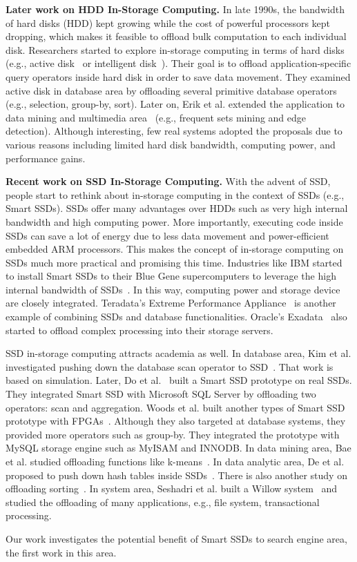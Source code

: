 \textbf{Later work on HDD In-Storage Computing.}
In late 1990s, the bandwidth of hard disks (HDD) kept growing while the cost of powerful processors kept dropping, which makes it feasible to offload bulk computation to each individual disk. Researchers started to explore in-storage computing in terms of hard disks (e.g., active disk~\cite{Acharya1998ADP} or intelligent disk~\cite{Keeton1998}). Their goal is to offload application-specific query operators inside hard disk in order to save data movement. They examined active disk in database area by offloading several primitive database operators (e.g., selection, group-by, sort). Later on, Erik et al. extended the application to data mining and multimedia area~\cite{Riedel1998ASL} (e.g., frequent sets mining and edge detection). Although interesting, few real systems adopted the proposals due to various reasons including limited hard disk bandwidth, computing power, and performance gains.



\textbf{Recent work on SSD In-Storage Computing.}
With the advent of SSD, people start to rethink about in-storage computing in the context of SSDs (e.g., Smart SSDs).
SSDs offer many advantages over HDDs such as very high internal bandwidth and high computing power. More importantly, executing code inside SSDs can save a lot of energy due to less data movement and power-efficient embedded ARM processors. %
This makes the concept of in-storage computing on SSDs much more practical and promising this time.
Industries like IBM started to install Smart SSDs to their Blue Gene supercomputers to leverage the high internal bandwidth of SSDs~\cite{Julich13}. In this way, computing power and storage device are closely integrated. Teradata's Extreme Performance Appliance~\cite{Teradata20} is another example of combining SSDs and database functionalities. Oracle's Exadata~\cite{Oracle2010} also started to offload complex processing into their storage servers.

SSD in-storage computing attracts academia as well. In database area, Kim et al. investigated pushing down the database scan operator to SSD~\cite{KimOPCL11}. That work is based on simulation. Later, Do et al.~\cite{Do2013QPS} built a Smart SSD prototype on real SSDs. They integrated Smart SSD with Microsoft SQL Server by offloading two operators: scan and aggregation. Woods et al. built another types of Smart SSD prototype with FPGAs~\cite{WoodsIA14}. Although they also targeted at database systems, they provided more operators such as group-by. They integrated the prototype with MySQL storage engine such as MyISAM and INNODB. In data mining area, Bae et al. studied offloading functions like k-means~\cite{BaeKKOP13}. In data analytic area, De et al. proposed to push down hash tables inside SSDs~\cite{De2013}. There is also another study on offloading sorting~\cite{Young14}. In system area, Seshadri et al. built a Willow system~\cite{Sudharsan14} and studied the offloading of many applications, e.g., file system, transactional processing.

Our work investigates the potential benefit of Smart SSDs to search engine area, the first work in this area.

